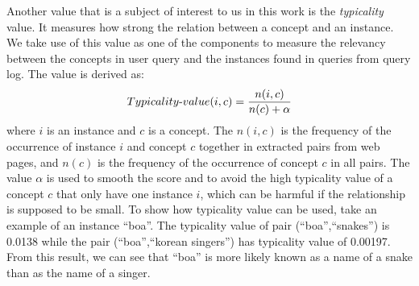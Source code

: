 Another value that is a subject of interest to us in this work is 
the \textit{typicality} value. It measures how strong the relation 
between a concept and an instance. We take use of this value as one 
of the components to measure the relevancy between the concepts in 
user query and the instances found in queries from query log. The 
value is derived as:
\[Typicality\textnormal{-}value(i, c) = \frac{n(i, c)}{n(c)+\alpha}\]
where $i$ is an instance and $c$ is a concept. The $n(i,c)$ is the 
frequency of the occurrence of instance $i$ and concept $c$ together 
in extracted pairs from web pages, and $n(c)$ is the frequency of the 
occurrence of concept $c$ in all pairs. The value $\alpha$ is used 
to smooth the score and to avoid the high typicality value of a 
concept $c$ that only have one instance $i$, which can be harmful 
if the relationship is supposed to be small. To show how typicality 
value can be used, take an example of an instance ``boa''. The 
typicality value of pair (``boa'',``snakes'') is 0.0138 while the pair 
(``boa'',``korean singers'') has typicality value of 0.00197. From 
this result, we can see that ``boa'' is more likely known as a name 
of a snake than as the name of a singer.
\\
\\


%

